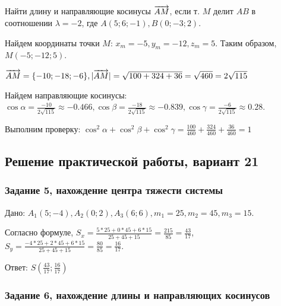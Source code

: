 \documentclass{article}
\def\vec{\ensuremath\overrightarrow}
\begin{document}
\begin{flushleft}

Найти длину и направляющие косинусы $\vec{AM}$, если т. $M$ делит $AB$ в соотношении $\lambda = -2$, где $A(5; 6; -1), B(0; -3; 2)$.

Найдем координаты точки $M$: $x_m = -5, y_m = -12, z_m = 5$. Таким образом, $M(-5; -12; 5)$.

$\vec{AM} = \{-10; -18; -6\}, |\vec{AM}| = \sqrt{100 + 324 + 36} = \sqrt{460} = 2\sqrt{115}$

Найдем направляющие косинусы: $\cos \alpha = \frac{-10}{2\sqrt{115}} \approx -0.466, \cos \beta = \frac{-18}{2\sqrt{115}} \approx -0.839, \cos \gamma = \frac{-6}{2\sqrt{115}} \approx 0.28$.

Выполним проверку: $\cos^2 \alpha + \cos^2 \beta + \cos^2 \gamma = \frac{100}{460} + \frac{324}{460} + \frac{36}{460} = 1$

\end{flushleft}

\subsection{Решение практической работы, вариант 21}

\subsubsection{Задание 5, нахождение центра тяжести системы}

\begin{flushleft}

Дано: $A_1(5; -4), A_2(0; 2), A_3(6; 6), m_1 = 25, m_2 = 45, m_3 = 15$.

Согласно формуле,
$S_x = \frac{5 * 25 + 0 * 45 + 6 * 15}{25 + 45 + 15} = \frac{215}{85} = \frac{43}{17}$,
$S_y = \frac{-4 * 25 + 2 * 45 + 6 * 15}{25 + 45 + 15} = \frac{80}{85} = \frac{16}{17}$.

Ответ: $S(\frac{43}{17}; \frac{16}{17})$

\end{flushleft}

\subsubsection{Задание 6, нахождение длины и направляющих косинусов}
\end{document}
